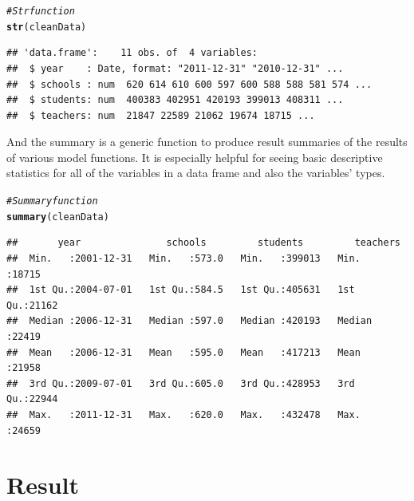 \documentclass{article}\usepackage[]{graphicx}\usepackage[]{color}
\makeatletter
\newcommand{\hlcom}[1]{\textcolor[rgb]{0.678,0.584,0.686}{\textit{#1}}}%
\newcommand{\hlstd}[1]{\textcolor[rgb]{0.345,0.345,0.345}{#1}}%
\newcommand{\hlkwd}[1]{\textcolor[rgb]{0.737,0.353,0.396}{\textbf{#1}}}%
\newenvironment{kframe}{%
 \def\at@end@of@kframe{}%
 \ifinner\ifhmode%
  \def\at@end@of@kframe{\end{minipage}}%
  \begin{minipage}{\columnwidth}%
 \fi\fi%
 \def\FrameCommand##1{\hskip\@totalleftmargin \hskip-\fboxsep
 \colorbox{shadecolor}{##1}\hskip-\fboxsep
     \hskip-\linewidth \hskip-\@totalleftmargin \hskip\columnwidth}%
 \MakeFramed {\advance\hsize-\width
   \@totalleftmargin\z@ \linewidth\hsize
   \@setminipage}}%
 {\par\unskip\endMakeFramed%
 \at@end@of@kframe}
\newenvironment{knitrout}{}{} %
\makeatother
\begin{document}
\begin{enumerate}
\begin{knitrout}
\color{fgcolor}\begin{kframe}
\begin{alltt}
\hlcom{# Str function}
\hlkwd{str}\hlstd{(cleanData)}
\end{alltt}
\begin{verbatim}
## 'data.frame':	11 obs. of  4 variables:
##  $ year    : Date, format: "2011-12-31" "2010-12-31" ...
##  $ schools : num  620 614 610 600 597 600 588 588 581 574 ...
##  $ students: num  400383 402951 420193 399013 408311 ...
##  $ teachers: num  21847 22589 21062 19674 18715 ...
\end{verbatim}
\end{kframe}
\end{knitrout}
And the summary is a generic function to produce result summaries of the results of various model functions. It is especially helpful for seeing basic descriptive statistics for all of the variables in a data frame and also the variables’ types.

\begin{knitrout}
\color{fgcolor}\begin{kframe}
\begin{alltt}
\hlcom{# Summary function}
\hlkwd{summary}\hlstd{(cleanData)}
\end{alltt}
\begin{verbatim}
##       year               schools         students         teachers    
##  Min.   :2001-12-31   Min.   :573.0   Min.   :399013   Min.   :18715  
##  1st Qu.:2004-07-01   1st Qu.:584.5   1st Qu.:405631   1st Qu.:21162  
##  Median :2006-12-31   Median :597.0   Median :420193   Median :22419  
##  Mean   :2006-12-31   Mean   :595.0   Mean   :417213   Mean   :21958  
##  3rd Qu.:2009-07-01   3rd Qu.:605.0   3rd Qu.:428953   3rd Qu.:22944  
##  Max.   :2011-12-31   Max.   :620.0   Max.   :432478   Max.   :24659
\end{verbatim}
\end{kframe}
\end{knitrout}



\end {enumerate}

\section {Result}
\end{document}
